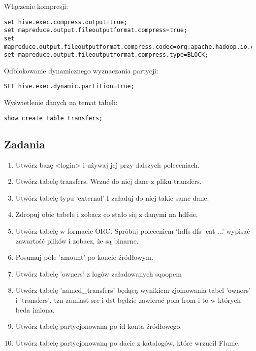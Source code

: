 \documentclass{article}
\begin{document}
Włączenie kompresji:
\begin{lstlisting}
set hive.exec.compress.output=true;
set mapreduce.output.fileoutputformat.compress=true;
set mapreduce.output.fileoutputformat.compress.codec=org.apache.hadoop.io.compress.GzipCodec;
set mapreduce.output.fileoutputformat.compress.type=BLOCK;
\end{lstlisting}

Odblokowanie dynamicznego wyznaczania partycji:
\begin{lstlisting}
SET hive.exec.dynamic.partition=true;
\end{lstlisting}

Wyświetlenie danych na temat tabeli:
\begin{lstlisting}
show create table transfers;
\end{lstlisting}

\subsection*{Zadania}

\begin{enumerate}
\item Utwórz bazę <login> i używaj jej przy dalszych poleceniach.
\item Utwórz tabelę transfers. Wrzuć do niej dane z pliku transfers.
\item Utwórz tabelę typu ‘external’ I załaduj do niej takie same dane.
\item Zdropuj obie tabele i zobacz co stało się z danymi na hdfsie.
\item Utwórz tabelę w formacie ORC. Spróbuj poleceniem ‘hdfs dfs -cat ...’ wypisać zawartość plików i zobacz, że są binarne.
\item Posumuj pole 'amount' po koncie źródłowym.
\item Utwórz tabelę 'owners' z logów załadowanych sqoopem
\item Utwórz tabelę 'named\_transfers' będącą wynikiem zjoinowania tabel 'owners' i 'transfers', tzn zamiast src i dst będzie zawierać pola from i to w których beda imiona.
\item Utwórz tabelę partycjonowaną po id konta źródłowego.
\item Utwórz tabelę partycjonowaną po dacie z katalogów, które wrzucił Flume.
\end{enumerate}
\end{document}

